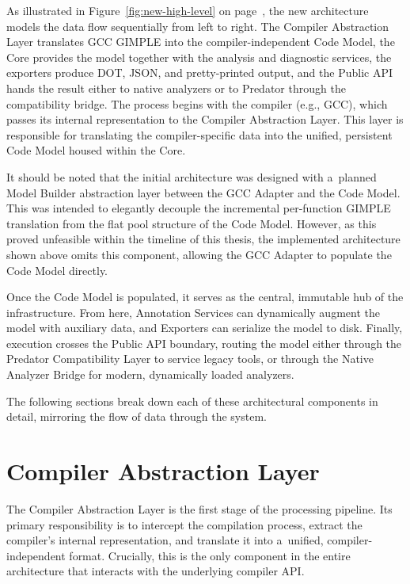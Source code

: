 \documentclass[xpsejal00-gcc-plugin.tex]{subfiles}
\begin{document}
As illustrated in Figure~\ref{fig:new-high-level} on page~\pageref{fig:new-high-level}, the new architecture models the data flow sequentially from left to right.
The Compiler Abstraction Layer translates GCC GIMPLE into the compiler-independent Code Model, the Core provides the model together with the analysis and diagnostic services, the exporters produce DOT, JSON, and pretty-printed output, and the Public API hands the result either to native analyzers or to Predator through the compatibility bridge.
The process begins with the compiler (e.g., GCC), which passes its internal representation to the Compiler Abstraction Layer.
This layer is responsible for translating the compiler-specific data into the unified, persistent Code Model housed within the Core.

It should be noted that the initial architecture was designed with a~planned Model Builder abstraction layer between the GCC Adapter and the Code Model.
This was intended to elegantly decouple the incremental per-function GIMPLE translation from the flat pool structure of the Code Model.
However, as this proved unfeasible within the timeline of this thesis, the implemented architecture shown above omits this component, allowing the GCC Adapter to populate the Code Model directly.

Once the Code Model is populated, it serves as the central, immutable hub of the infrastructure.
From here, Annotation Services can dynamically augment the model with auxiliary data, and Exporters can serialize the model to disk.
Finally, execution crosses the Public API boundary, routing the model either through the Predator Compatibility Layer to service legacy tools, or through the Native Analyzer Bridge for modern, dynamically loaded analyzers.

The following sections break down each of these architectural components in detail, mirroring the flow of data through the system.

\section{Compiler Abstraction Layer}\label{sec:compiler-abstraction-layer}

The Compiler Abstraction Layer is the first stage of the processing pipeline.
Its primary responsibility is to intercept the compilation process, extract the compiler's internal representation, and translate it into a~unified, compiler-independent format.
Crucially, this is the only component in the entire architecture that interacts with the underlying compiler API.\@
\end{document}
